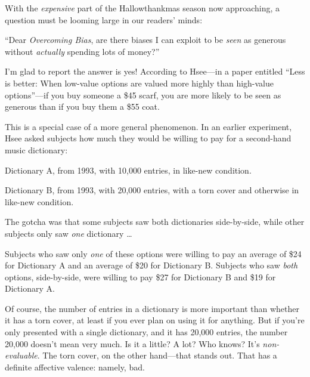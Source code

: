 \myendsectiontext


\bigskip


{
 With the \textit{expensive} part of the Hallowthankmas season now
approaching, a question must be looming large in our
readers' minds:}

{
 ``Dear \textit{Overcoming Bias}, are there biases
I can exploit to be \textit{seen} as generous without \textit{actually}
spending lots of money?''}

{
 I'm glad to report the answer is yes! According to
Hsee---in a paper entitled ``Less is better: When
low-value options are valued more highly than high-value
options''---if you buy someone a \$45 scarf, you are
more likely to be seen as generous than if you buy them a \$55
coat.}

{
 This is a special case of a more general phenomenon. In an earlier
experiment, Hsee asked subjects how much they would be willing to pay
for a second-hand music dictionary:}

{
 Dictionary A, from 1993, with 10,000 entries, in like-new
condition.}

{
 Dictionary B, from 1993, with 20,000 entries, with a torn cover
and otherwise in like-new condition.}

{
 The gotcha was that some subjects saw both dictionaries
side-by-side, while other subjects only saw \textit{one} dictionary
\ldots}

{
 Subjects who saw only \textit{one} of these options were willing
to pay an average of \$24 for Dictionary A and an average of \$20 for
Dictionary B. Subjects who saw \textit{both} options, side-by-side,
were willing to pay \$27 for Dictionary B and \$19 for Dictionary A.}

{
 Of course, the number of entries in a dictionary is more important
than whether it has a torn cover, at least if you ever plan on using it
for anything. But if you're only presented with a
single dictionary, and it has 20,000 entries, the number 20,000
doesn't mean very much. Is it a little? A lot? Who
knows? It's \textit{non-evaluable}. The torn cover, on
the other hand---that stands out. That has a definite affective
valence: namely, bad.}

